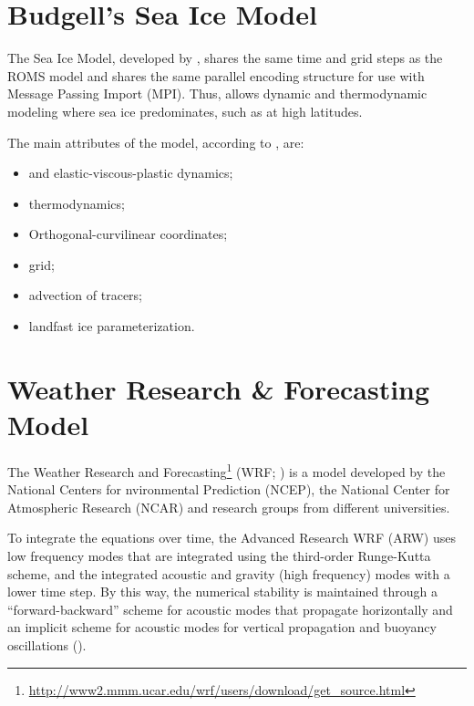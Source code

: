 \section{Budgell's Sea Ice Model}\label{seaicesecao}
\bigskip

\noindent The Sea Ice Model, developed by \textcite{Budgell2005}, shares the same time and grid steps as the ROMS model and shares the same parallel encoding structure 
for use with Message Passing Import (MPI). Thus, allows dynamic and thermodynamic modeling where sea ice predominates, such as at high latitudes.
\bigskip

\noindent The main attributes of the model, according to \textcite{hedstrom2018}, are:
\bigskip
\begin{itemize}
    \item \textcite{Hunke1997} and \textcite{Hunke2001} elastic-viscous-plastic dynamics;
    \item \textcite{Mellor1989} thermodynamics;
    \item Orthogonal-curvilinear coordinates;
    \item \textcite{Arakawa1977} grid;
    \item \textcite{Smolarkiewicz1990} advection of tracers;
    \item \textcite{Lemieux2015} landfast ice parameterization.
\end{itemize}
\bigskip



\section{Weather Research \& Forecasting Model}\label{secaowrf}
\bigskip

\noindent The Weather Research and Forecasting\textcolor{bleu_cite}{\textit{}\footnote{\textcolor{bleu_cite}{\href{http://www2.mmm.ucar.edu/wrf/users/download/get\_source.html}{http://www2.mmm.ucar.edu/wrf/users/download/get\_source.html}}}} 
(WRF; \cite{Skamarock2008}) is a model developed by the National Centers for nvironmental Prediction (NCEP), the National Center for 
Atmospheric Research (NCAR) and research groups from different universities.
\bigskip

\noindent To integrate the equations over time, the Advanced Research WRF (ARW) uses low frequency modes that are integrated using the third-order Runge-Kutta scheme, 
and the integrated acoustic and gravity (high frequency) modes with a lower time step. By this way, the numerical stability is maintained through a “forward-backward” scheme for
acoustic modes that propagate horizontally and an implicit scheme for acoustic modes for vertical propagation and buoyancy oscillations (\cite{Skamarock2008}).
\bigskip

